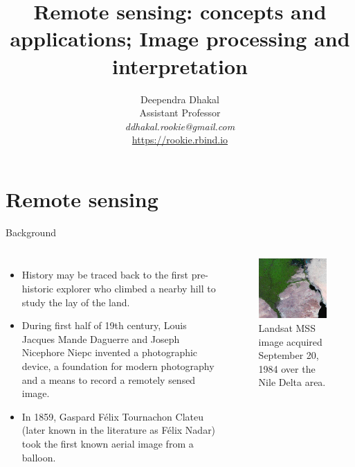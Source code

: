 \documentclass[10pt,dvipsnames,ignorenonframetext,aspectratio=169]{beamer}
\title[]{Remote sensing: concepts and applications; Image processing
and interpretation}
\author[
        Deependra Dhakal\\
Assistant Professor\\
\textit{ddhakal.rookie@gmail.com}\\
\url{https://rookie.rbind.io}
    ]{Deependra Dhakal\\
Assistant Professor\\
\textit{ddhakal.rookie@gmail.com}\\
\url{https://rookie.rbind.io}}
\date[
      
  ]{
    }
\begin{document}
  \begin{frame}[plain]
  \titlepage
  \end{frame}



\hypertarget{remote-sensing}{%
\section{Remote sensing}\label{remote-sensing}}

\begin{frame}{Background}
\protect\hypertarget{background}{}
\begin{columns}[T, onlytextwidth]

\begin{itemize}
\item History may be traced back to the first pre-historic explorer who climbed a nearby hill to study the lay of the land.
\item During first half of 19th century, Louis Jacques Mande Daguerre and Joseph Nicephore Niepc invented a photographic device, a foundation for modern photography and a means to record a remotely sensed image.
\item In 1859, Gaspard Félix Tournachon Clateu (later known in the literature as Félix Nadar) took the first known aerial image from a balloon.
\end{itemize}

\begin{figure}
\includegraphics[width=0.88\linewidth]{../images/landsat_mss_september20_1984_nile_delta} \caption{Landsat MSS image acquired September 20, 1984 over the Nile Delta area.}\label{fig:historical-landsat}
\end{figure}

\end{columns}
\end{frame}
\end{document}
